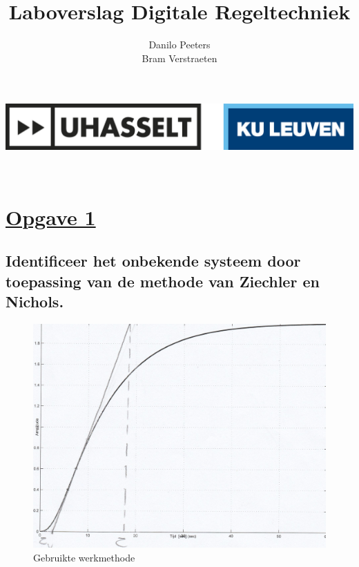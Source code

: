 \documentclass[a4paper, 12pt]{article}
\title{Laboverslag Digitale Regeltechniek}
\author{Danilo Peeters \\ Bram Verstraeten}
\begin{document}
\makeatletter
    \begin{titlepage}
	    \includegraphics[width=1\linewidth]{Logo_Uhasselt_KULeuven.jpeg}\\[30ex]
        \begin{center}
            {\huge \@title }\\[20ex] 
            {\large\@author}
        \end{center}
    \end{titlepage}
\makeatother

\newpage

\section{\underline{Opgave 1}}

\subsection{Identificeer het onbekende systeem door toepassing van de methode van Ziechler en Nichols.}

\begin{table}[!h]
\begin{large}
\centering
{}
\end{large}
\end{table}

\begin{figure}[!h]
	\includegraphics[width=1\linewidth]{Labo1_1.jpg}
	\caption{Gebruikte werkmethode}
\end{figure}	
	
\end{document}
